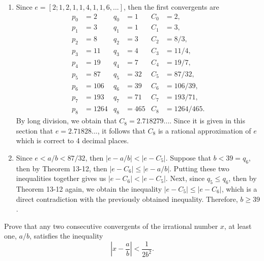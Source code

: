 \begin{solution}
    \begin{enumerate}
        \item Since $e = [2; 1, 2, 1, 1, 4, 1, 1, 6, ...]$, then the first convergents are
        \begin{align*}
            p_0 &= 2 & q_0 &= 1 & C_0 &= 2, \\
            p_1 &= 3 & q_1 &= 1 & C_1 &= 3, \\
            p_2 &= 8 & q_2 &= 3 & C_2 &= 8/3, \\
            p_3 &= 11 & q_3 &= 4 & C_3 &= 11/4, \\
            p_4 &= 19 & q_4 &= 7 & C_4 &= 19/7, \\
            p_5 &= 87 & q_5 &= 32 & C_5 &= 87/32, \\
            p_6 &= 106 & q_6 &= 39 & C_6 &= 106/39, \\
            p_7 &= 193 & q_7 &= 71 & C_7 &= 193/71, \\
            p_8 &= 1264 & q_8 &= 465 & C_8 &= 1264/465.
        \end{align*}
        By long division, we obtain that $C_8 = 2.718279...$. Since it is given in this section that $e = 2.71828...$, it follows that $C_8$ is a rational approximation of $e$ which is correct to 4 decimal places.
        \item Since $e < a/b < 87/32$, then $|e - a/b| < |e - C_5|$. Suppose that $b < 39 = q_6$, then by Theorem 13-12, then $|e - C_6| \leq |e - a/b|$. Putting these two inequalities together gives us $|e - C_6| < |e - C_5|$. Next, since $q_5 \leq q_6$, then by Theorem 13-12 again, we obtain the inequality $|e - C_5| \leq |e- C_6|$, which is a direct contradiction with the previously obtained inequality. Therefore, $b \geq 39$. \\
    \end{enumerate}
\end{solution}

\begin{exercise}
    Prove that any two consecutive convergents of the irrational number $x$, at least one, $a/b$, satisfies the inequality
    $$\left|x - \frac{a}{b}\right| < \frac{1}{2b^2}.$$
     \\
\end{exercise}

